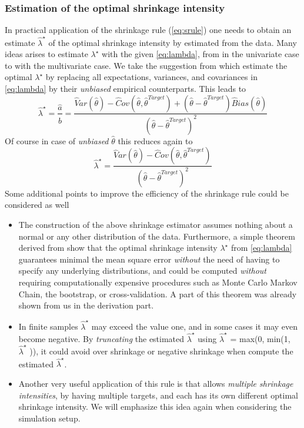 \subsubsection{Estimation of the optimal shrinkage intensity}
In practical application of the shrinkage rule (\autoref{eq:srule}) one needs to obtain an estimate $\hat \lambda^\star$ of the optimal shrinkage intensity by estimated from the data. Many ideas arises to estimate $\lambda^\star$ with the given \autoref{eq:lambda}, from \cite{Thompson:1968p2499} in the univariate case to \cite{Ledoit:2003p2496} with the multivariate case. We take the suggestion from \cite{Schafer:2005p1040} which estimate the optimal $\lambda^\star$ by replacing all expectations, variances, and covariances in \autoref{eq:lambda} by their {\it unbiased} empirical counterparts. This leads to
\begin{equation} \label{eq:lambda_hat}
	\hat \lambda^\star = \frac{\hat a}{\hat b} = \frac{\hat Var(\hat \theta) - \hat Cov(\hat \theta, \hat \theta^{Target}) + (\hat \theta - \hat \theta^{Target})\hat Bias(\hat \theta)}{(\hat \theta - {\hat \theta}^{Target})^2}
\end{equation}
Of course in case of {\it unbiased} $\hat \theta$ this reduces again to
\begin{equation} \label{eq:lambda_hat_unbias}
	\hat \lambda^\star = \frac{\hat Var(\hat \theta) - \hat Cov(\hat \theta, \hat \theta^{Target})}{(\hat \theta - {\hat \theta}^{Target})^2}
\end{equation}
Some additional points to improve the efficiency of the shrinkage rule could be considered as well
\begin{itemize}
	\item The construction of the above shrinkage estimator assumes nothing about a normal or any other distribution of the data. Furthermore, a simple theorem derived from \cite{Ledoit:2003p2496} show that the optimal shrinkage intensity $\lambda^\star$ from \autoref{eq:lambda} guarantees minimal the mean square error {\it without} the need of having to specify any underlying distributions, and could be computed {\it without} requiring computationally expensive procedures such as Monte Carlo Markov Chain, the bootstrap, or cross-validation. A part of this theorem was already shown from us in the derivation part.
	\item In finite samples $\hat \lambda^\star$ may exceed the value one, and in some cases it may even become negative. By {\it truncating} the estimated $\hat \lambda^\star$ using $\hat \lambda^\star$ = max(0, min(1, $\hat \lambda^\star$ )), it could avoid over shrinkage or negative shrinkage when compute the estimated  $\hat \lambda^\star$.
	\item Another very useful application of this rule is that allows {\it multiple shrinkage intensities}, by having multiple targets, and each has its own different optimal shrinkage intensity. We will emphasize this idea again when considering the simulation setup.
\end{itemize}
